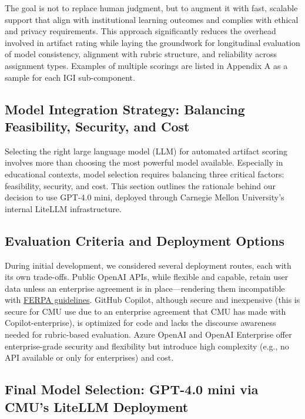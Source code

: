 \documentclass[12pt]{article}%
\begin{document}
The goal is not to replace human judgment, but to augment it with fast, scalable support that align with institutional learning outcomes and complies with ethical and privacy requirements. This approach significantly reduces the overhead involved in artifact rating while laying the groundwork for longitudinal evaluation of model consistency, alignment with rubric structure, and reliability across assignment types. Examples of multiple scorings are listed in Appendix A as a sample for each IGI sub-component. 


\subsection*{Model Integration Strategy: Balancing Feasibility, Security, and Cost}

Selecting the right large language model (LLM) for automated artifact scoring involves more than choosing the most powerful model available. Especially in educational contexts, model selection requires balancing three critical factors: feasibility, security, and cost. This section outlines the rationale behind our decision to use GPT-4.0 mini, deployed through Carnegie Mellon University’s internal LiteLLM infrastructure.

\subsection*{Evaluation Criteria and Deployment Options}

During initial development, we considered several deployment routes, each with its own trade-offs. Public OpenAI APIs, while flexible and capable, retain user data unless an enterprise agreement is in place—rendering them incompatible with \href{https://studentprivacy.ed.gov/ferpa}{FERPA guidelines}. GitHub Copilot, although secure and inexpensive (this is secure for CMU use due to an enterprise agreement that CMU has made with Copilot-enterprise), is optimized for code and lacks the discourse awareness needed for rubric-based evaluation. Azure OpenAI and OpenAI Enterprise offer enterprise-grade security and flexibility but introduce high complexity (e.g., no API available or only for enterprises) and cost.

\subsection*{Final Model Selection: GPT-4.0 mini via CMU’s LiteLLM Deployment}
\end{document}
